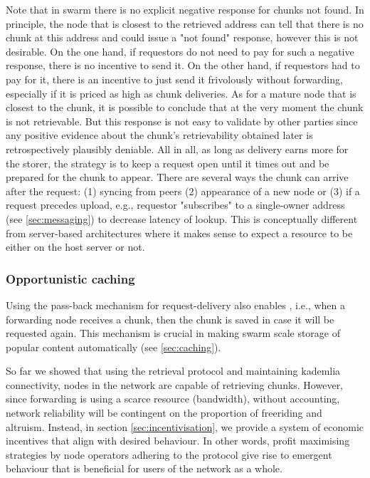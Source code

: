Note that in swarm there is no explicit negative response for chunks not found. In principle, the node that is closest to the retrieved address can tell that there is no chunk at this address and could issue a "not found" response, however this is not desirable. On the one hand, if requestors do not need to pay for such a negative response, there is no incentive to send it.
On the other hand, if requestors had to pay for it, there is an incentive to just send it frivolously without forwarding, especially if it is priced as high as chunk deliveries. As for a mature node that is closest to the chunk, it is possible to conclude that at the very moment the chunk is not retrievable. But this response is not easy to validate by other parties since any positive evidence about the chunk's retrievability  obtained later is retrospectively plausibly deniable.
All in all, as long as delivery earns more for the storer, the strategy is to keep a request open until it times out and be prepared for the chunk to appear. There are several ways the chunk can arrive after the request: (1) syncing from peers (2) appearance of a new node or (3) if a request precedes upload, e.g., requestor "subscribes" to a single-owner address (see \ref{sec:messaging}) to  decrease latency of lookup. This is conceptually different from server-based architectures where it makes sense to expect a resource to be either on the host server or not. 
 

\subsubsection{Opportunistic caching}

Using the pass-back mechanism for request-delivery also enables , i.e., when a forwarding node receives a chunk, then the chunk is saved in case it will be requested again. This mechanism is crucial in making swarm scale storage of popular  content automatically (see \ref{sec:caching}).


So far we showed that using the retrieval protocol and maintaining kademlia connectivity, nodes in the network are capable of retrieving chunks. However, since forwarding is using a scarce resource (bandwidth), without accounting, network reliability will be contingent on the proportion of freeriding and altruism. Instead, in section \ref{sec:incentivisation}, we provide a system of economic incentives that align with desired behaviour. In other words, profit maximising strategies by node operators adhering to the protocol give rise to emergent behaviour that is beneficial for users of the network as a whole.
 
